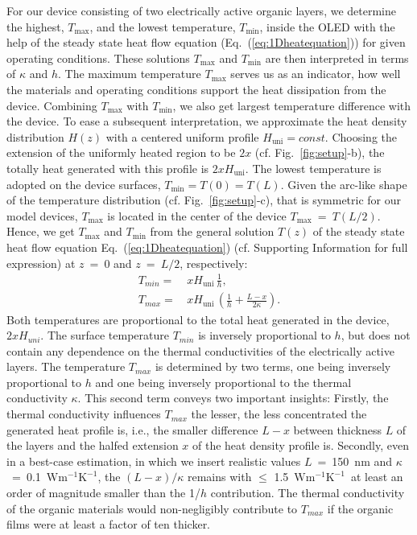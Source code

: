 \documentclass[%
9pt,
 aip,
rsi,%
 amsmath,amssymb,
preprint,%
]{revtex4-1}
\newcommand{\thermalconductivity}{$\mathrm{W m^{-1} K^{-1}}$}
\begin{document}
For our device consisting of two electrically active organic layers, we determine the highest, $T_{\mathrm{max}}$, and the lowest temperature, $T_{\mathrm{min}}$, inside the OLED with the help of the steady state heat flow equation (Eq.~(\ref{eq:1Dheatequation})) for given operating conditions. These solutions $T_{\mathrm{max}}$ and $T_{\mathrm{min}}$ are then interpreted in terms of $\kappa$ and $h$.
The maximum temperature $T_{\mathrm{max}}$ serves us as an indicator, how well the materials and operating conditions support the heat dissipation from the device. 
Combining $T_{\mathrm{max}}$ with $T_{\mathrm{min}}$, we also get largest temperature difference with the device.
To ease a subsequent interpretation, we approximate the heat density distribution $H(z)$ with a centered uniform profile $H_{\mathrm{uni}} = const$. 
Choosing the extension of the uniformly heated region to be $2x$ (cf. Fig.~\ref{fig:setup}-b), the totally heat generated with this profile is $2 x H_{\mathrm{uni}}$.
The lowest temperature is adopted on the device surfaces, $T_{\mathrm{min}} = T(0) = T(L)$. 
Given the arc-like shape of the temperature distribution (cf. Fig.~\ref{fig:setup}-c), that is symmetric for our model devices, $T_{\mathrm{max}}$ is located in the center of the device $T_{\mathrm{max}}$~=~$T(L/2)$.
%
Hence, we get $T_{\mathrm{max}}$ and $T_{\mathrm{min}}$  from the general solution $T(z)$ of the steady state heat flow equation Eq.~(\ref{eq:1Dheatequation}) (cf. Supporting Information for full expression) at $z~=~0$ and $z~=~L/2$, respectively:
\begin{subequations}
      \begin{align}
      	T_{min}=&\, x H_{\mathrm{uni}}\, \frac{1}{h},                                             \label{eq:analtmin}\\
        T_{max}=&\, x H_{\mathrm{uni}}\, \left(\frac{1}{h}+\frac{L - x}{2\kappa}\right) .		 \label{eq:analtmax}
      \end{align}
      \label{eq:analt} 
\end{subequations}
%
Both temperatures are proportional to the total heat generated in the device, $2 x H_{uni}$.
The surface temperature $T_{min}$ is inversely proportional to $h$, but does not contain any dependence on the thermal conductivities of the electrically active layers.
The temperature $T_{max}$ is determined by two terms, one being inversely proportional to $h$ and one being inversely proportional to the thermal conductivity $\kappa$. 
This second term conveys two important insights:
Firstly, the thermal conductivity influences $T_{max}$ the lesser, the less concentrated the generated heat profile is, i.e., the smaller difference $L-x$ between thickness $L$ of the layers and the halfed extension $x$ of the heat density profile is.
Secondly, even in a best-case estimation, in which we insert realistic values $L$~=~150~nm and $\kappa$~=~0.1~\thermalconductivity, the $(L-x)/\kappa$ remains with $\leq$ 1.5~\thermalconductivity~at least an order of magnitude smaller than the 1/$h$ contribution.
The thermal conductivity of the organic materials would non-negligibly contribute to $T_{max}$ if the organic films were at least a factor of ten thicker.
\end{document}
